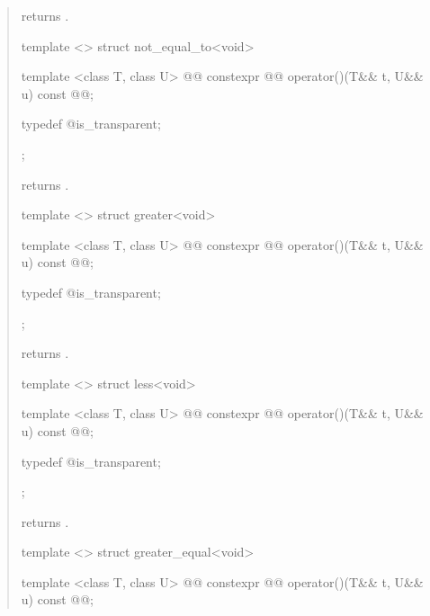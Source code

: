 \begin{quote}
\begin{itemdescr}
\pnum
{} returns .
\end{itemdescr}

%
\begin{itemdecl}
template <> struct not_equal_to<void> {
  template <class T, class U>
    @@
  constexpr @@ operator()(T&& t, U&& u) const
    @@;

  typedef @\unspec@ is_transparent;
};
\end{itemdecl}

\begin{itemdescr}
\pnum
{} returns .
\end{itemdescr}

%
\begin{itemdecl}
template <> struct greater<void> {
  template <class T, class U>
    @@
  constexpr @@ operator()(T&& t, U&& u) const
    @@;

  typedef @\unspec@ is_transparent;
};
\end{itemdecl}

\begin{itemdescr}
\pnum
{} returns .
\end{itemdescr}

%
\begin{itemdecl}
template <> struct less<void> {
  template <class T, class U>
    @@
  constexpr @@ operator()(T&& t, U&& u) const
    @@;

  typedef @\unspec@ is_transparent;
};
\end{itemdecl}

\begin{itemdescr}
\pnum
{} returns .
\end{itemdescr}

%
\begin{itemdecl}
template <> struct greater_equal<void> {
  template <class T, class U>
    @@
  constexpr @@ operator()(T&& t, U&& u) const
    @@;

}
\end{itemdecl}
\end{quote}
